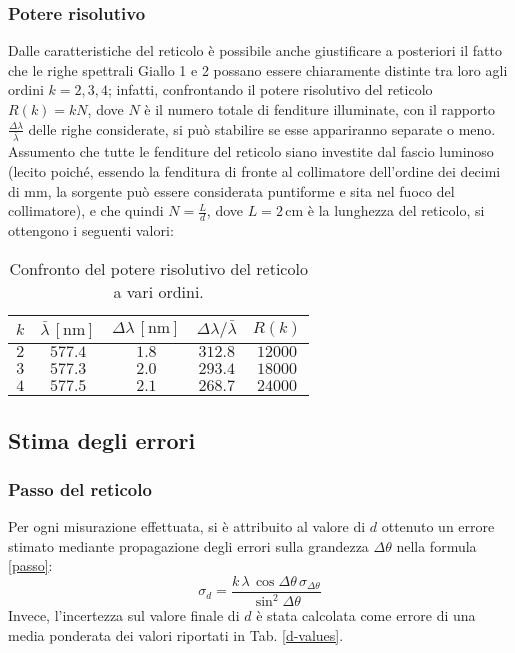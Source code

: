 \documentclass[]{article}
\let\oldsubsection\subsection%
\renewcommand{\subsection}{%
	\renewcommand{\theequation}{\thesubsection.\arabic{equation}}%
	\oldsubsection}%
\begin{document}
    \subsubsection{Potere risolutivo}
    Dalle caratteristiche del reticolo è possibile anche giustificare a posteriori il fatto che le righe spettrali Giallo 1 e 2 possano essere chiaramente distinte tra loro agli ordini $k = 2, 3, 4$; infatti, confrontando il potere risolutivo del reticolo $R(k) = k N$, dove $N$ è il numero totale di fenditure illuminate, con il rapporto $\frac{\Delta\lambda}{\bar{\lambda}}$ delle righe considerate, si può stabilire se esse appariranno separate o meno. \\
    Assumento che tutte le fenditure del reticolo siano investite dal fascio luminoso (lecito poiché, essendo la fenditura di fronte al collimatore dell'ordine dei decimi di mm, la sorgente può essere considerata puntiforme e sita nel fuoco del collimatore), e che quindi $N = \frac{L}{d}$, dove $L = 2 \,\text{cm}$ è la lunghezza del reticolo, si ottengono i seguenti valori:
    \begin{table}
        \centering
        \begin{tabular}[H]{||c|c|c|c|c||}
            \hline
            $k$ & $\bar{\lambda} \, \left[\text{nm}\right]$ & $\Delta\lambda \, \left[\text{nm}\right]$ & $\Delta\lambda/\bar{\lambda}$ & $R(k)$ \\
            \hline\hline
            $2$ & $577.4$ & $1.8$ & $312.8$ & $12000$ \\\hline
            $3$ & $577.3$ & $2.0$ & $293.4$ & $18000$ \\\hline
            $4$ & $577.5$ & $2.1$ & $268.7$ & $24000$ \\\hline
        \end{tabular}
        \label{R}
        \caption{Confronto del potere risolutivo del reticolo a vari ordini.}
    \end{table}

    \subsection{Stima degli errori}
    \subsubsection{Passo del reticolo}
    Per ogni misurazione effettuata, si è attribuito al valore di $d$ ottenuto un errore stimato mediante propagazione degli errori sulla grandezza $\Delta \theta$ nella formula \ref{passo}:
    \begin{equation}
        \label{d-error}
        \sigma_d = \frac{k \, \lambda \, \cos{\Delta\theta} \, \sigma_{\Delta \theta}}{\sin^2{\Delta\theta}}
    \end{equation}
    Invece, l'incertezza sul valore finale di $d$ è stata calcolata come errore di una media ponderata dei valori riportati in Tab. \ref{d-values}.
    \label{par:errore_passo}
\end{document}

